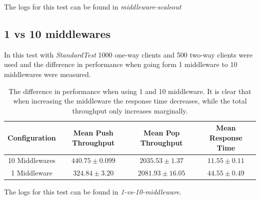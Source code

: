 \documentclass{article}
\begin{document}
        The logs for this test can be found in \textit{middleware-scaleout}

        \subsection{1 vs 10 middlewares}    
            In this test with \textit{StandardTest} 1000 one-way clients and 500 two-way clients were used and the difference in performance when going form 1 middleware to 10 middlewares were measured.
            
            \begin{table}
            	\begin{tabular}{|c|c|c|c|}
            	\hline 
            	Configuration & Mean Push Throughput & Mean Pop Throughput & Mean Response Time \\ 
            	\hline 
            	10 Middlewares & $440.75  \pm 0.099$ & $2035.53 \pm 1.37$ & $11.55 \pm 0.11$ \\ 
            	\hline 
            	1 Middleware & $324.84 \pm 3.20$ & $2081.93 \pm 16.05$ & $44.55 \pm 0.49$ \\ 
            	\hline 
            	\end{tabular} 
                \caption{The difference in performance when using 1 and 10 middleware. It is clear that when increasing the middleware the response time decreases, while the total throughput  only increases marginally.}
                \label{tbl:differnce_1_and_10_mw}
            \end{table}
            
        The logs for this test can be found in \textit{1-vs-10-middleware}.
\end{document}
